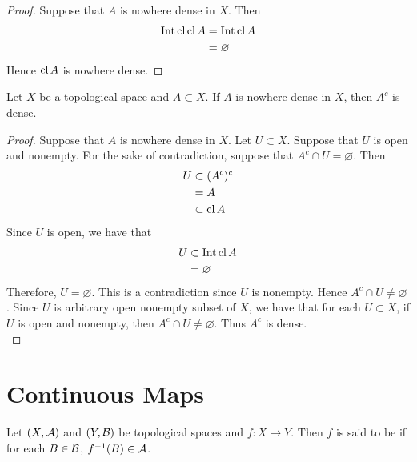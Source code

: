 \documentclass{book}
\begin{document}
	\begin{proof}
		Suppose that $A$ is nowhere dense in $X$. Then 
		\begin{align*}
			\operatorname{Int} \operatorname{cl} \operatorname{cl} A
			& = \operatorname{Int} \operatorname{cl} A \\
			& = \varnothing
		\end{align*}
		Hence $\operatorname{cl} A$ is nowhere dense.
	\end{proof}
	

	\begin{ex}  
		Let $X$ be a topological space and $A \subset X$. If $A$ is nowhere dense in $X$, then $A^c$ is dense.
	\end{ex}
	
	\begin{proof}
		Suppose that $A$ is nowhere dense in $X$. Let $U \subset X$. Suppose that $U$ is open and nonempty. For the sake of contradiction, suppose that  $A^c \cap U = \varnothing$. Then 
		\begin{align*}
			U 
			& \subset (A^c)^c \\
			& = A \\
			& \subset \operatorname{cl} A
		\end{align*}
		Since $U$ is open, we have that  
		\begin{align*}
			U 
			& \subset \operatorname{Int} \operatorname{cl} A \\
			& = \varnothing 
		\end{align*}
		Therefore, $U = \varnothing$. This is a contradiction since $U$ is nonempty. Hence $A^c \cap U \neq \varnothing$. Since $U$ is arbitrary open nonempty subset of $X$, we have that for each $U \subset X$, if $U$ is open and nonempty, then $A^c \cap U \neq \varnothing$. Thus $A^c$ is dense.  \\
	\end{proof}
	
	
	
	
	
	
	
	
	
	
	
	
	
	
	
	
	
	
	
	
	
	
	
	\newpage
	\section{Continuous Maps}	
	
	\begin{defn} \ld{}
	Let $(X,\mathcal{A})$ and $(Y,\mathcal{B})$ be topological spaces and $f:X \rightarrow Y$. Then $f$ is said to be  if for each $B \in \mathcal{B}$, $f^{-1}(B) \in \mathcal{A}$.
	\end{defn}
	
\end{document}
